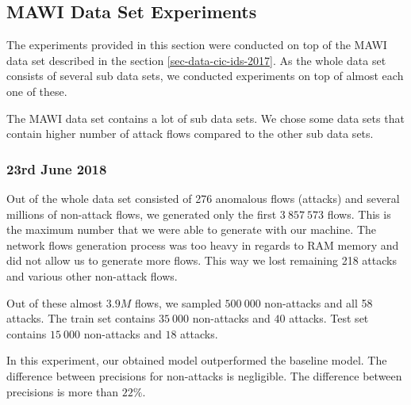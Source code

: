 \documentclass{article}
\begin{document}
\clearpage

\subsection{MAWI Data Set Experiments}\label{sec-mawi-experiments}


The experiments provided in this section were conducted on top of the MAWI data set described in the section \ref{sec-data-cic-ids-2017}. As the whole data set consists of several sub data sets, we conducted experiments on top of almost each one of these.

The MAWI data set contains a lot of sub data sets. We chose some data sets that contain higher number of attack flows compared to the other sub data sets.

\subsubsection{23rd June 2018}

Out of the whole data set consisted of 276 anomalous flows (attacks) and several millions of non-attack flows, we generated only the first $3\ 857\ 573$ flows. This is the maximum number that we were able to generate with our machine. The network flows generation process was too heavy in regards to RAM memory and did not allow us to generate more flows. This way we lost remaining 218 attacks and various other non-attack flows.

Out of these almost $3.9M$ flows, we sampled $500\ 000$ non-attacks and all 58 attacks. The train set contains $35\ 000$ non-attacks and $40$ attacks. Test set contains $15\ 000$ non-attacks and $18$ attacks.

In this experiment, our obtained model outperformed the baseline model. The difference between precisions for non-attacks is negligible. The difference between precisions is more than $22\%$.
\end{document}
